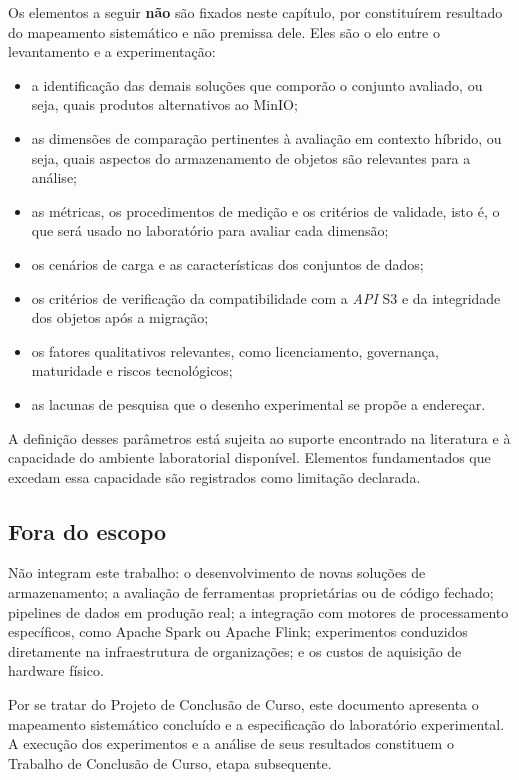 Os elementos a seguir \textbf{não} são fixados neste capítulo, por constituírem
resultado do mapeamento sistemático e não premissa dele. Eles são o elo entre o
levantamento e a experimentação:

\begin{itemize}
    \item a identificação das demais soluções que comporão o conjunto avaliado, ou
          seja, quais produtos alternativos ao MinIO;
    \item as dimensões de comparação pertinentes à avaliação em contexto híbrido,
          ou seja, quais aspectos do armazenamento de objetos são relevantes para
          a análise;
    \item as métricas, os procedimentos de medição e os critérios de validade, isto
          é, o que será usado no laboratório para avaliar cada dimensão;
    \item os cenários de carga e as características dos conjuntos de dados;
    \item os critérios de verificação da compatibilidade com a \textit{API} S3 e da
          integridade dos objetos após a migração;
    \item os fatores qualitativos relevantes, como licenciamento, governança,
          maturidade e riscos tecnológicos;
    \item as lacunas de pesquisa que o desenho experimental se propõe a endereçar.
\end{itemize}

A definição desses parâmetros está sujeita ao suporte encontrado na literatura e à
capacidade do ambiente laboratorial disponível. Elementos fundamentados que
excedam essa capacidade são registrados como limitação declarada.

\subsection{Fora do escopo}

Não integram este trabalho: o desenvolvimento de novas soluções de armazenamento;
a avaliação de ferramentas proprietárias ou de código fechado; pipelines de dados
em produção real; a integração com motores de processamento específicos, como
Apache Spark ou Apache Flink; experimentos conduzidos diretamente na infraestrutura
de organizações; e os custos de aquisição de hardware físico.

Por se tratar do Projeto de Conclusão de Curso, este documento apresenta o
mapeamento sistemático concluído e a especificação do laboratório experimental. A
execução dos experimentos e a análise de seus resultados constituem o Trabalho de
Conclusão de Curso, etapa subsequente.


